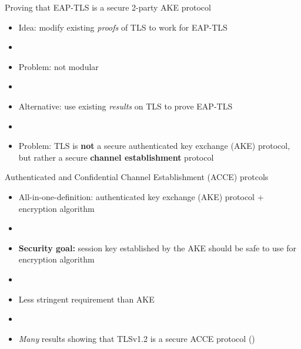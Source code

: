 \documentclass[xcolor={dvipsnames},screen, aspectratio=43,compress]{beamer}
\begin{document}
\begin{frame}{Proving that EAP-TLS is a secure 2-party AKE protocol}
	
	
	\begin{itemize}
		\item<1-> Idea: modify existing \emph{proofs} of TLS to work for EAP-TLS
		
		\item[] 
		
		\item<2-> Problem: not modular
		
		\item[]
		
		\item<3-> Alternative: use existing \emph{results} on TLS to prove EAP-TLS
		
		\item[]
		
		\item<4-> Problem: TLS is \textbf{not} a secure authenticated key exchange (AKE) protocol,
		but rather a secure \textbf{channel establishment} protocol
		
	\end{itemize}
		
\end{frame}




\begin{frame}{Authenticated and Confidential Channel Establishment (ACCE)  protcols \cite{C:JKSS12}}
	\begin{itemize}
		\item All-in-one-definition: authenticated key exchange (AKE) protocol + encryption algorithm
	
		\item[]
		
		\item \textbf{Security goal:} session key established by the AKE should be safe to use for encryption algorithm
		
		\item[]
			
		\item Less stringent requirement than AKE
		
		\item[]
		
		\item \emph{Many} results showing that TLSv1.2 is a secure ACCE protocol (\cite{C:JKSS12,C:KraPatWee13,EPRINT:KohSchSch13,BrzuskaFSWW:2012:less_is_more,PKC:LSYKS14})
	\end{itemize}	
		
\end{frame}
\end{document}
